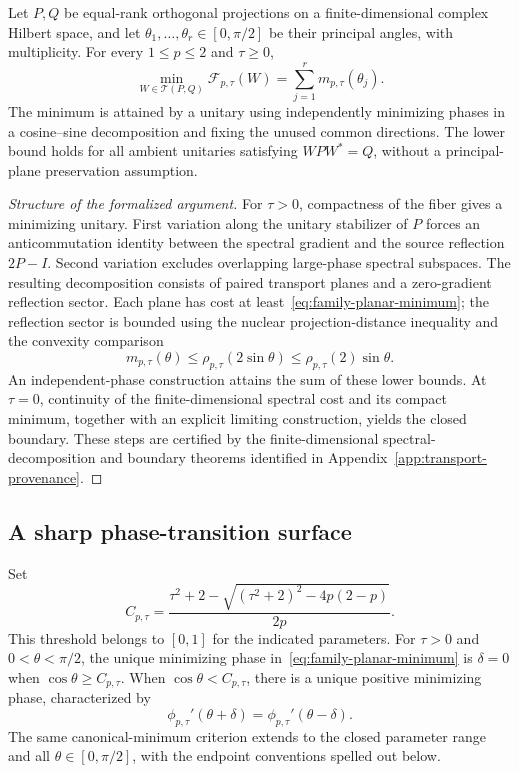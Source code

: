 \begin{theorem}
\label{thm:family-finite}
Let $P,Q$ be equal-rank orthogonal projections on a finite-dimensional
complex Hilbert space, and let
$\theta_1,\ldots,\theta_r\in[0,\pi/2]$ be their principal angles,
with multiplicity.  For every $1\le p\le2$ and $\tau\ge0$,
\begin{equation}
 \min_{W\in\mathcal T(P,Q)}\mathcal F_{p,\tau}(W)
   =\sum_{j=1}^r m_{p,\tau}(\theta_j).
 \label{eq:family-finite-minimum}
\end{equation}
The minimum is attained by a unitary using independently minimizing
phases in a cosine--sine decomposition and fixing the unused common
directions.  The lower bound holds for all ambient unitaries satisfying
$WPW^*=Q$, without a principal-plane preservation assumption.
\end{theorem}

\begin{proof}[Structure of the formalized argument]
For $\tau>0$, compactness of the fiber gives a minimizing unitary.
First variation along the unitary stabilizer of $P$ forces an
anticommutation identity between the spectral gradient and the source
reflection $2P-I$.  Second variation excludes overlapping large-phase
spectral subspaces.  The resulting decomposition consists of paired
transport planes and a zero-gradient reflection sector.  Each plane
has cost at least~\eqref{eq:family-planar-minimum}; the reflection
sector is bounded using the nuclear projection-distance inequality
and the convexity comparison
\[
 m_{p,\tau}(\theta)
   \le\rho_{p,\tau}(2\sin\theta)
   \le\rho_{p,\tau}(2)\sin\theta.
\]
An independent-phase construction attains the sum of these lower
bounds.  At $\tau=0$, continuity of the finite-dimensional spectral
cost and its compact minimum, together with an explicit limiting
construction, yields the closed boundary.  These steps are certified
by the finite-dimensional spectral-decomposition and boundary
theorems identified in Appendix~\ref{app:transport-provenance}.
\end{proof}

\subsection{A sharp phase-transition surface}
\label{sec:family-phase}

Set
\begin{equation}
 C_{p,\tau}=
 \frac{\tau^2+2-\sqrt{(\tau^2+2)^2-4p(2-p)}}{2p}.
 \label{eq:family-critical-cosine}
\end{equation}
This threshold belongs to $[0,1]$ for the indicated parameters.
For $\tau>0$ and $0<\theta<\pi/2$, the unique minimizing phase
in~\eqref{eq:family-planar-minimum} is $\delta=0$ when
$\cos\theta\ge C_{p,\tau}$.  When $\cos\theta<C_{p,\tau}$,
there is a unique positive minimizing phase, characterized by
\[
 \phi_{p,\tau}'(\theta+\delta)
   =\phi_{p,\tau}'(\theta-\delta).
\]
The same canonical-minimum criterion extends to the closed parameter
range and all $\theta\in[0,\pi/2]$, with the endpoint conventions
spelled out below.

